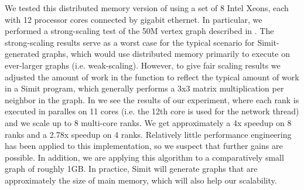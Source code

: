 We tested this distributed memory version of  using a set
of 8 Intel Xeons, each with 12 processor cores connected by gigabit ethernet.
In particular, we performed a strong-scaling test of the 50M vertex graph
described in .  The strong-scaling results serve as
a worst case for the typical scenario for Simit-generated graphs, which 
would use distributed memory primarily to execute on ever-larger graphs
(i.e. weak-scaling).  However, to give fair scaling results
we adjusted the amount of
work in the  function to reflect the typical amount of work
in a Simit program, which generally performs a 3x3 matrix multiplication
per neighbor in the graph.  In  we see the results of
our experiment, where each rank is executed in paralles on 11 cores (i.e.
the 12th core is used for the network thread) and we scale up to 8
multi-core ranks.  We get approximately a 4x speedup on 8 ranks and a 2.78x
speedup on 4 ranks.  Relatively little performance engineering has been
applied to this implementation, so we suspect that further gains are 
possible.  In addition, we are applying this algorithm to a comparatively
small graph of roughly 1GB.  In practice, Simit will generate graphs that are
approximately the size of main memory, which will also help our scalability.






